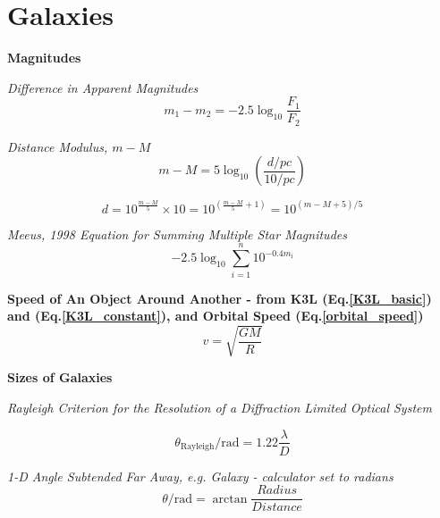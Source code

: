 \documentclass{article}
\begin{document}








\newpage

\section {Galaxies}
\textbf {Magnitudes}

\textit {Difference in Apparent Magnitudes}
\begin{equation}
m_\mathrm{1} - m_\mathrm{2} = -2.5 \log _\mathrm{10} \frac {F_\mathrm{1}}{F_\mathrm{2}}
\end{equation}

\textit {Distance Modulus, \(m - M\)}
\begin{equation}
m - M = 5 \log _\mathrm{10} \left( \frac {d / pc} {10 / pc} \right)
\end{equation}

\begin{equation}
d = 10^ \frac {m-M}{5} \times 10 = 10^ {\left( {\frac {m-M}{5} + 1} \right)} = 10^{(m-M+5)/5}
\end{equation}

\textit {Meeus, 1998 Equation for Summing Multiple Star Magnitudes}
\begin{equation}
-2.5 \log _{10} \sum_{i = 1}^{n} 10^{-0.4 m_\mathrm{i}}
\end{equation}

\textbf {Speed of An Object Around Another - from K3L (Eq.\ref{K3L_basic}) and (Eq.\ref{K3L_constant}), and Orbital Speed (Eq.\ref{orbital_speed})}
\begin{equation}
v = \sqrt {\frac {GM} {R}}
\end{equation}


\textbf {Sizes of Galaxies}

\textit{Rayleigh Criterion for the Resolution of a Diffraction Limited Optical System}

\begin{equation}
\theta_\mathrm{Rayleigh} / \mathrm{rad} = 1.22 \frac{\lambda}{D}
\end{equation}

\textit{1-D Angle Subtended Far Away, e.g. Galaxy - calculator set to radians}
\begin{equation}
\theta/\mathrm{rad} = \arctan \frac {Radius} {Distance}
\end{equation}
\end{document}
